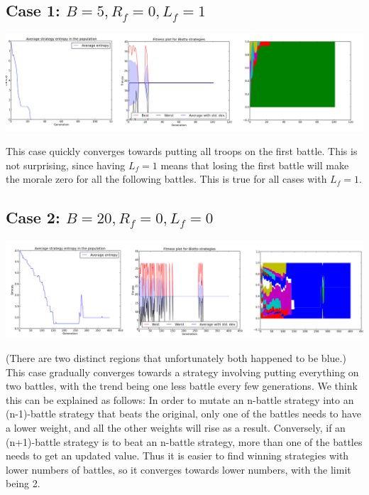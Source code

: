 \documentclass[a4paper,12pt]{article}
\begin{document}
\subsection{Case 1: $B=5, R_{f}=0, L_{f}=1$}
\centerline{\includegraphics[width=1.2\textwidth]{case1}}
This case quickly converges towards putting all troops on the first battle. This is not surprising, since having $L_{f}=1$ means that losing the first battle will make the morale zero for all the following battles. This is true for all cases with $L_{f}=1$.

\subsection{Case 2: $B=20, R_{f}=0, L_{f}=0$}
\centerline{\includegraphics[width=1.2\textwidth]{case2}}
\small{(There are two distinct regions that unfortunately both happened to be blue.)}\\
This case gradually converges towards a strategy involving putting everything on two battles, with the trend being one less battle every few generations. We think this can be explained as follows: In order to mutate an n-battle strategy into an (n-1)-battle strategy that beats the original, only one of the battles needs to have a lower weight, and all the other weights will rise as a result. Conversely, if an (n+1)-battle strategy is to beat an n-battle strategy, more than one of the battles needs to get an updated value. Thus it is easier to find winning strategies with lower numbers of battles, so it converges towards lower numbers, with the limit being 2.
\end{document}
